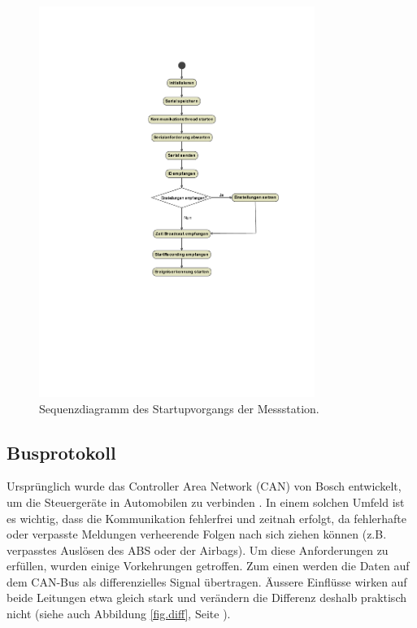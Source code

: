 \begin{figure}
	\centering
		\includegraphics[width=0.8\textwidth]{images/magicdraw/AblaufSensor.pdf}
	\caption{Sequenzdiagramm des Startupvorgangs der Messstation.}
	\label{fig.seqstartupsensor}
\end{figure}


\subsection{Busprotokoll}\label{subsec.sw_busprotokoll}
Ursprünglich wurde das Controller Area Network (CAN) von Bosch entwickelt, um die Steuergeräte in Automobilen zu verbinden \cite{boschcanspec2}. In einem solchen Umfeld ist es wichtig, dass die Kommunikation fehlerfrei und zeitnah erfolgt, da fehlerhafte oder verpasste Meldungen verheerende Folgen nach sich ziehen können (z.B. verpasstes Auslösen des ABS oder der Airbags). Um diese Anforderungen zu erfüllen, wurden einige Vorkehrungen getroffen. Zum einen werden die Daten auf dem CAN-Bus als differenzielles Signal übertragen. Äussere Einflüsse wirken auf beide Leitungen etwa gleich stark und verändern die Differenz deshalb praktisch nicht (siehe auch Abbildung \ref{fig.diff}, Seite \pageref{fig.diff}).

